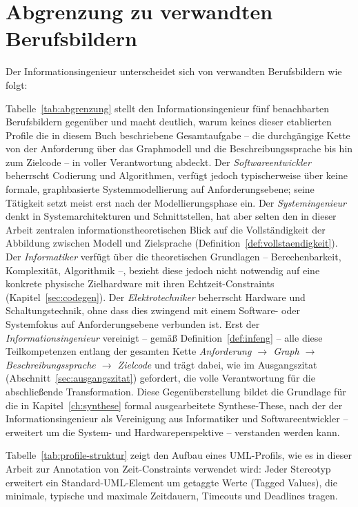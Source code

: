 ﻿\documentclass[a4paper,12pt]{report}
\theoremstyle{definition}
\begin{document}
\section{Abgrenzung zu verwandten Berufsbildern}

Der Informationsingenieur unterscheidet sich von verwandten Berufsbildern wie folgt:

Tabelle~\ref{tab:abgrenzung} stellt den Informationsingenieur fünf
benachbarten Berufsbildern gegenüber und macht deutlich, warum keines dieser
etablierten Profile die in diesem Buch beschriebene Gesamtaufgabe -- die
durchgängige Kette von der Anforderung über das Graphmodell und die
Beschreibungssprache bis hin zum Zielcode -- in voller Verantwortung
abdeckt. Der \emph{Softwareentwickler} beherrscht Codierung und Algorithmen,
verfügt jedoch typischerweise über keine formale, graphbasierte
Systemmodellierung auf Anforderungsebene; seine Tätigkeit setzt meist erst
nach der Modellierungsphase ein. Der \emph{Systemingenieur} denkt in
Systemarchitekturen und Schnittstellen, hat aber selten den in dieser Arbeit
zentralen informationstheoretischen Blick auf die Vollständigkeit der
Abbildung zwischen Modell und Zielsprache (Definition~\ref{def:vollstaendigkeit}).
Der \emph{Informatiker} verfügt über die theoretischen Grundlagen --
Berechenbarkeit, Komplexität, Algorithmik --, bezieht diese jedoch nicht
notwendig auf eine konkrete physische Zielhardware mit ihren
Echtzeit-Constraints (Kapitel~\ref{sec:codegen}). Der \emph{Elektrotechniker}
beherrscht Hardware und Schaltungstechnik, ohne dass dies zwingend mit einem
Software- oder Systemfokus auf Anforderungsebene verbunden ist. Erst der
\emph{Informationsingenieur} vereinigt -- gemäß
Definition~\ref{def:infeng} -- alle diese Teilkompetenzen entlang der
gesamten Kette \emph{Anforderung $\to$ Graph $\to$ Beschreibungssprache
$\to$ Zielcode} und trägt dabei, wie im Ausgangszitat
(Abschnitt~\ref{sec:ausgangszitat}) gefordert, die volle Verantwortung für
die abschließende Transformation. Diese Gegenüberstellung bildet die
Grundlage für die in Kapitel~\ref{ch:synthese} formal ausgearbeitete
Synthese-These, nach der der Informationsingenieur als Vereinigung aus
Informatiker und Softwareentwickler -- erweitert um die
System- und Hardwareperspektive -- verstanden werden kann.

Tabelle~\ref{tab:profile-struktur} zeigt den Aufbau eines UML-Profils, wie es in dieser Arbeit zur Annotation von Zeit-Constraints verwendet wird: Jeder Stereotyp erweitert ein Standard-UML-Element um getaggte Werte (Tagged Values), die minimale, typische und maximale Zeitdauern, Timeouts und Deadlines tragen.
\end{document}
